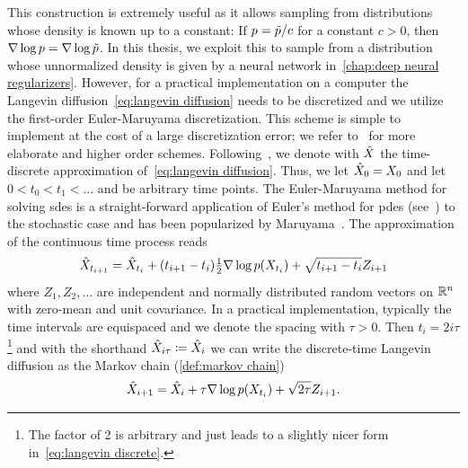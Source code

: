 This construction is extremely useful as it allows sampling from distributions whose density is known up to a constant:
If \( p = \tilde{p} / c \) for a constant \( c > \num{0} \), then \( \nabla \log p = \nabla \log \tilde{p} \).
In this thesis, we exploit this to sample from a distribution whose unnormalized density is given by a neural network in~\cref{chap:deep neural regularizers}.
However, for a practical implementation on a computer the Langevin diffusion~\cref{eq:langevin diffusion} needs to be discretized and we utilize the first-order Euler-Maruyama discretization.
This scheme is simple to implement at the cost of a large discretization error; we refer to~\cite[chapter 6]{Glasserman2003} for more elaborate and higher order schemes.
Following~\cite[chapter 6]{Glasserman2003}, we denote with \( \hat{X} \) the time-discrete approximation of~\cref{eq:langevin diffusion}.
Thus, we let \( \hat{X}_{\num{0}} = X_{\num{0}} \) and let \( \num{0} < t_{\num{0}} < t_{\num{1}} < \ldots \) and be arbitrary time points.
The Euler-Maruyama method for solving \glspl{sde} is a straight-forward application of Euler's method for \glspl{pde} (see~\cite[chapter 1]{hairer_ode_1993}) to the stochastic case and has been popularized by Maruyama~\cite{Maruyama1955}.
The approximation of the continuous time process reads
\begin{equation}
	\hat{X}_{t_{i+{\num{1}}}} = \hat{X}_{t_i} + (t_{i+{\num{1}}} - t_i)\tfrac{1}{2}\nabla\log p(X_{t_i}) + \sqrt{t_{i+{\num{1}}} - t_i} Z_{i+{\num{1}}}
\end{equation}
where \( Z_{\num{1}}, Z_{\num{2}}, \dotsc \) are independent and normally distributed random vectors on \( \mathbb{R}^n \) with zero-mean and unit covariance.
In a practical implementation, typically the time intervals are equispaced and we denote the spacing with \( \tau > \num{0} \).
Then \( t_i = \num{2}i\tau \)\footnote{%
	The factor of \num{2} is arbitrary and just leads to a slightly nicer form in~\cref{eq:langevin discrete}.
} and with the shorthand \( \hat{X}_{i\tau} \coloneqq \hat{X}_{i} \) we can write the discrete-time Langevin diffusion as the Markov chain (\cref{def:markov chain})
\begin{equation}
	\hat{X}_{i+\num{1}} = \hat{X}_i + \tau\nabla\log p(X_{t_i}) + \sqrt{\num{2}\tau} Z_{i+1}.
	\label{eq:langevin discrete}
\end{equation}
